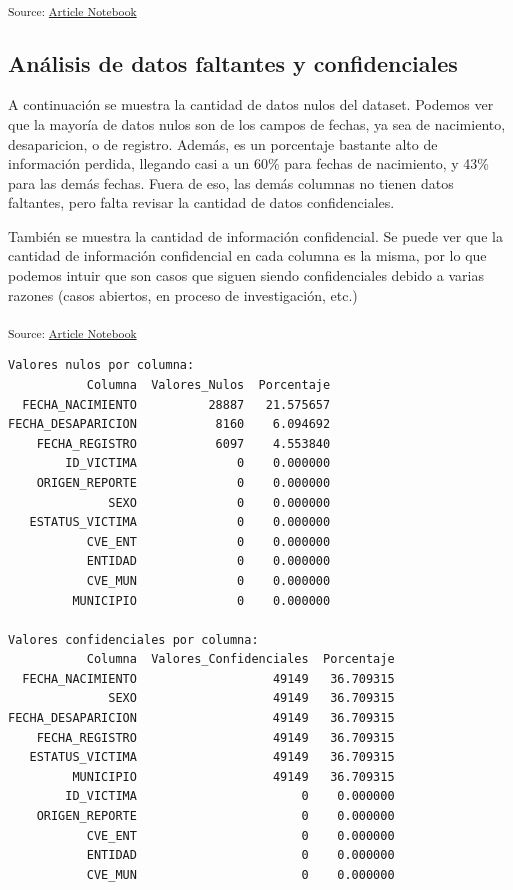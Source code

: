 \documentclass[
]{agujournal2019}
\begin{document}
\textsubscript{Source:
\href{https://Rou-uu.github.io/pruebaQuarto/index.qmd.html}{Article
Notebook}}

\subsection{Análisis de datos faltantes y
confidenciales}\label{anuxe1lisis-de-datos-faltantes-y-confidenciales}

A continuación se muestra la cantidad de datos nulos del dataset.
Podemos ver que la mayoría de datos nulos son de los campos de fechas,
ya sea de nacimiento, desaparicion, o de registro. Además, es un
porcentaje bastante alto de información perdida, llegando casi a un 60\%
para fechas de nacimiento, y 43\% para las demás fechas. Fuera de eso,
las demás columnas no tienen datos faltantes, pero falta revisar la
cantidad de datos confidenciales.

También se muestra la cantidad de información confidencial. Se puede ver
que la cantidad de información confidencial en cada columna es la misma,
por lo que podemos intuir que son casos que siguen siendo confidenciales
debido a varias razones (casos abiertos, en proceso de investigación,
etc.)

\textsubscript{Source:
\href{https://Rou-uu.github.io/pruebaQuarto/index.qmd.html}{Article
Notebook}}

\begin{verbatim}
Valores nulos por columna:
           Columna  Valores_Nulos  Porcentaje
  FECHA_NACIMIENTO          28887   21.575657
FECHA_DESAPARICION           8160    6.094692
    FECHA_REGISTRO           6097    4.553840
        ID_VICTIMA              0    0.000000
    ORIGEN_REPORTE              0    0.000000
              SEXO              0    0.000000
   ESTATUS_VICTIMA              0    0.000000
           CVE_ENT              0    0.000000
           ENTIDAD              0    0.000000
           CVE_MUN              0    0.000000
         MUNICIPIO              0    0.000000

Valores confidenciales por columna:
           Columna  Valores_Confidenciales  Porcentaje
  FECHA_NACIMIENTO                   49149   36.709315
              SEXO                   49149   36.709315
FECHA_DESAPARICION                   49149   36.709315
    FECHA_REGISTRO                   49149   36.709315
   ESTATUS_VICTIMA                   49149   36.709315
         MUNICIPIO                   49149   36.709315
        ID_VICTIMA                       0    0.000000
    ORIGEN_REPORTE                       0    0.000000
           CVE_ENT                       0    0.000000
           ENTIDAD                       0    0.000000
           CVE_MUN                       0    0.000000
\end{verbatim}
\end{document}
